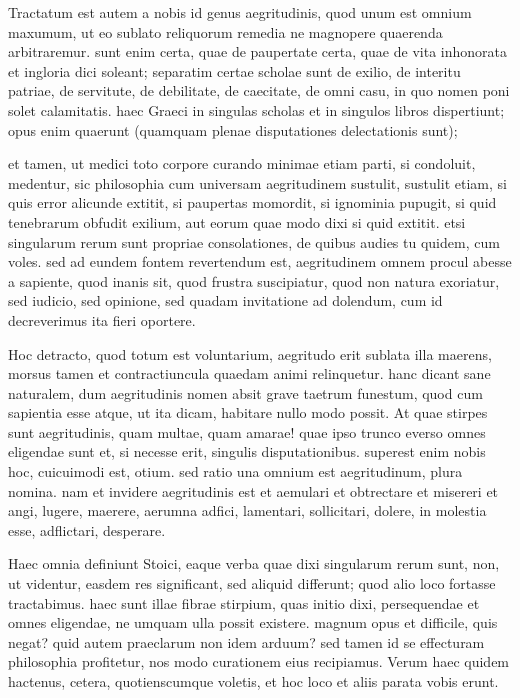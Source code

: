  Tractatum est autem a nobis id genus aegritudinis, quod unum est omnium maxumum, ut eo sublato reliquorum remedia ne magnopere quaerenda arbitraremur. sunt enim certa, quae de paupertate certa, quae de vita inhonorata et ingloria dici soleant; separatim certae scholae sunt de exilio, de interitu patriae, de servitute, de debilitate, de caecitate, de omni casu, in quo nomen poni solet calamitatis. haec Graeci in singulas scholas et in singulos libros dispertiunt; opus enim quaerunt (quamquam plenae disputationes delectationis sunt);

 et tamen, ut medici toto corpore curando minimae etiam parti, si condoluit, medentur, sic philosophia cum universam aegritudinem sustulit, sustulit etiam, si quis error alicunde extitit, si paupertas momordit, si ignominia pupugit, si quid tenebrarum obfudit exilium, aut eorum quae modo dixi si quid extitit. etsi singularum rerum sunt propriae consolationes, de quibus audies tu quidem, cum voles. sed ad eundem fontem revertendum est, aegritudinem omnem procul abesse a sapiente, quod inanis sit, quod frustra suscipiatur, quod non natura exoriatur, sed iudicio, sed opinione, sed quadam invitatione ad dolendum, cum id decreverimus ita fieri oportere.

 Hoc detracto, quod totum est voluntarium, aegritudo erit sublata illa maerens, morsus tamen et contractiuncula quaedam animi relinquetur. hanc dicant sane naturalem, dum aegritudinis nomen absit grave taetrum funestum, quod cum sapientia esse atque, ut ita dicam, habitare nullo modo possit. At quae stirpes sunt aegritudinis, quam multae, quam amarae! quae ipso trunco everso omnes eligendae sunt et, si necesse erit, singulis disputationibus. superest enim nobis hoc, cuicuimodi est, otium. sed ratio una omnium est aegritudinum, plura nomina. nam et invidere aegritudinis est et aemulari et obtrectare et misereri et angi, lugere, maerere, aerumna adfici, lamentari, sollicitari, dolere, in molestia esse, adflictari, desperare.

 Haec omnia definiunt Stoici, eaque verba quae dixi singularum rerum sunt, non, ut videntur, easdem res significant, sed aliquid differunt; quod alio loco fortasse tractabimus. haec sunt illae fibrae stirpium, quas initio dixi, persequendae et omnes eligendae, ne umquam ulla possit existere. magnum opus et difficile, quis negat? quid autem praeclarum non idem arduum? sed tamen id se effecturam philosophia profitetur, nos modo curationem eius recipiamus. Verum haec quidem hactenus, cetera, quotienscumque voletis, et hoc loco et aliis parata vobis erunt.

